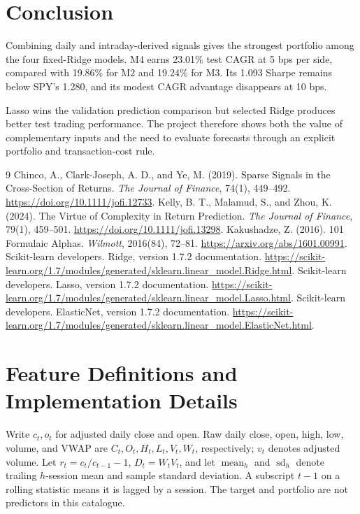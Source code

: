 \documentclass[11pt,a4paper]{article}
\begin{document}
\section{Conclusion}
Combining daily and intraday-derived signals gives the strongest portfolio
among the four fixed-Ridge models. M4 earns 23.01\% test CAGR at 5 bps per
side, compared with 19.86\% for M2 and 19.24\% for M3. Its 1.093 Sharpe
remains below SPY's 1.280, and its modest CAGR advantage disappears at 10 bps.

Lasso wins the validation prediction comparison but selected Ridge produces
better test trading performance. The project therefore shows both the value
of complementary inputs and the need to evaluate forecasts through an
explicit portfolio and transaction-cost rule.

\clearpage
\begin{thebibliography}{9}
Chinco, A., Clark-Joseph, A. D., and Ye, M. (2019).
Sparse Signals in the Cross-Section of Returns.
\emph{The Journal of Finance}, 74(1), 449--492.
\url{https://doi.org/10.1111/jofi.12733}.
Kelly, B. T., Malamud, S., and Zhou, K. (2024).
The Virtue of Complexity in Return Prediction.
\emph{The Journal of Finance}, 79(1), 459--501.
\url{https://doi.org/10.1111/jofi.13298}.
Kakushadze, Z. (2016). 101 Formulaic Alphas.
\emph{Wilmott}, 2016(84), 72--81.
\url{https://arxiv.org/abs/1601.00991}.
Scikit-learn developers. Ridge, version 1.7.2 documentation.
\url{https://scikit-learn.org/1.7/modules/generated/sklearn.linear_model.Ridge.html}.
Scikit-learn developers. Lasso, version 1.7.2 documentation.
\url{https://scikit-learn.org/1.7/modules/generated/sklearn.linear_model.Lasso.html}.
Scikit-learn developers. ElasticNet, version 1.7.2 documentation.
\url{https://scikit-learn.org/1.7/modules/generated/sklearn.linear_model.ElasticNet.html}.
\end{thebibliography}

\clearpage
\appendix
\section{Feature Definitions and Implementation Details}
\label{app:basic}
Write $c_t,o_t$ for adjusted daily close and open. Raw daily close, open,
high, low, volume, and VWAP are $C_t,O_t,H_t,L_t,V_t,W_t$, respectively;
$v_t$ denotes adjusted volume.
Let $r_t=c_t/c_{t-1}-1$, $D_t=W_tV_t$, and let $\operatorname{mean}_h$ and
$\operatorname{sd}_h$ denote trailing $h$-session mean and sample standard
deviation. A subscript $t-1$ on a rolling statistic means it is lagged by a
session. The target and portfolio are not predictors in this catalogue.
\end{document}
